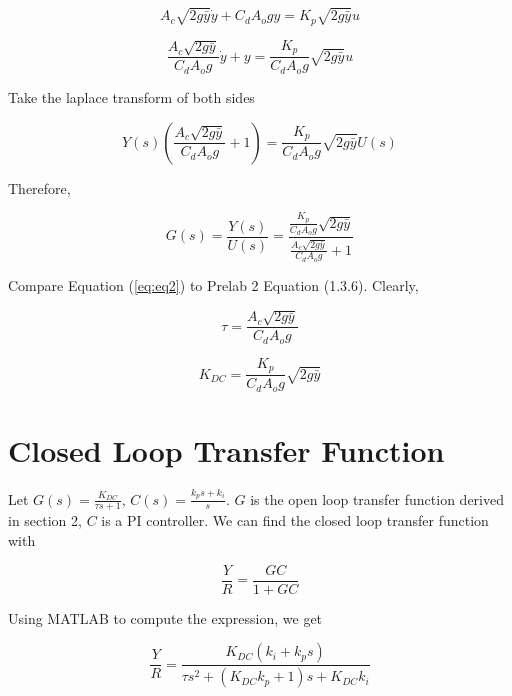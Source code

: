 \documentclass[12pt]{article}
\numberwithin{equation}{section}
\newcommand\ddfrac[2]{\frac{\displaystyle #1}{\displaystyle #2}}
\begin{document}
  \begin{equation}
    A_c \sqrt{2g \bar y} \dot y + C_d A_o g y = K_p \sqrt{2g\bar y} u
  \end{equation}

  \begin{equation}
    \frac{A_c\sqrt{2g\bar y}}{C_d A_o g} \dot y + y = \frac{K_p}{C_d A_o g}\sqrt{2g \bar y} u
  \end{equation}

  Take the laplace transform of both sides

  \begin{equation}
    Y(s) \left( \frac{A_c\sqrt{2g\bar y}}{C_d A_o g} + 1 \right) = \frac{K_p}{C_d A_o g}\sqrt{2g \bar y} U(s)
  \end{equation}

  Therefore,

  \begin{equation}\label{eq:eq2}
    G(s) = \frac{Y(s)}{U(s)} = \ddfrac{\frac{K_p}{C_d A_o g}\sqrt{2g \bar y}}{\frac{A_c\sqrt{2g\bar y}}{C_d A_o g} + 1}
  \end{equation}

  Compare Equation (\ref{eq:eq2}) to Prelab 2 Equation (1.3.6). Clearly,

  \begin{equation}
    \tau = \frac{A_c\sqrt{2g\bar y}}{C_d A_o g}
  \end{equation}

  \begin{equation}
    K_{DC} = \frac{K_p}{C_d A_o g}\sqrt{2g \bar y}
  \end{equation}

  \newpage

  \section{Closed Loop Transfer Function}

  Let $ G(s) = \frac{K_{DC}}{\tau s + 1}, \, C(s) = \frac{k_ps + k_i}{s}. $ $ G $ is the open loop transfer function derived in section 2, $ C $ is a PI controller. We can find the closed loop transfer function with

  \begin{equation}
    \frac{Y}{R} = \frac{GC}{1 + GC}
  \end{equation}

  Using MATLAB to compute the expression, we get

  \begin{equation}\label{eq:eq3}
    \frac{Y}{R} = \frac{K_{DC}(k_i + k_ps)}{\tau s ^2 + (K_{DC}k_p + 1)s + K_{DC}k_i}
  \end{equation}
\end{document}
